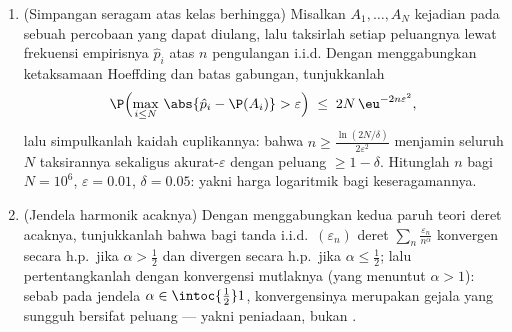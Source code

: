 \begin{problem}
\begin{enumerate}[resume]
  \item (Simpangan seragam atas kelas berhingga) Misalkan $A_1,
        \dots, A_N$ kejadian pada sebuah percobaan yang dapat diulang,
        lalu taksirlah setiap peluangnya lewat frekuensi
        empirisnya $\hat p_i$ atas $n$ pengulangan i.i.d.
        Dengan menggabungkan ketaksamaan Hoeffding dan batas gabungan,
        tunjukkanlah
        \[
        \P\Bigl(\max_{i\leq N}\,\abs{\hat p_i - \P(A_i)} >
        \varepsilon\Bigr) \;\leq\; 2N\,\eu^{-2n\varepsilon^2},
        \]
        lalu simpulkanlah kaidah  cuplikannya: bahwa $n \geq
        \frac{\ln(2N/\delta)}{2\varepsilon^2}$ menjamin
        seluruh $N$ taksirannya sekaligus
        akurat-$\varepsilon$ dengan peluang $\geq 1 -
        \delta$. Hitunglah $n$ bagi $N = 10^6$, $\varepsilon =
        0.01$, $\delta = 0.05$: yakni harga logaritmik bagi
        keseragamannya.
  \item (Jendela harmonik acaknya) Dengan menggabungkan kedua
        paruh teori deret acaknya, tunjukkanlah bahwa bagi
        tanda i.i.d.\ $(\varepsilon_n)$ deret
        $\sum_n\frac{\varepsilon_n}{n^\alpha}$ konvergen
        secara h.p.\ jika $\alpha > \frac12$ dan divergen secara h.p.\ jika
        $\alpha \leq \frac12$; lalu pertentangkanlah dengan konvergensi
        mutlaknya (yang menuntut $\alpha > 1$): sebab pada
        jendela $\alpha \in \intoc{\frac12}1$, konvergensinya
        merupakan gejala yang sungguh bersifat peluang ---
        yakni peniadaan, bukan .

\end{enumerate}
\end{problem}
